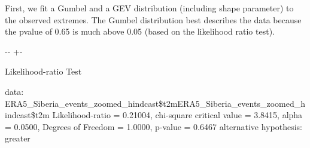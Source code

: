 \documentclass[letterpaper,10pt,english]{sphinxmanual}
\newlength\nbsphinxcodecellspacing
\begin{document}
First, we fit a Gumbel and a GEV distribution (including shape parameter) to the observed extremes. The Gumbel distribution best describes the data because the p\sphinxhyphen{}value of 0.65 is much above 0.05 (based on the likelihood ratio test).

{
\begin{sphinxVerbatim}[commandchars=\\\{\}]
\llap{\color{nbsphinxin}[11]:\,\hspace{\fboxrule}\hspace{\fboxsep}}    
                      
    
                      
 
\end{sphinxVerbatim}
}

{

\kern-\sphinxverbatimsmallskipamount\kern-\baselineskip
\kern+\FrameHeightAdjust\kern-\fboxrule
\vspace{\nbsphinxcodecellspacing}

\begin{sphinxVerbatim}[commandchars=\\\{\}]

        Likelihood-ratio Test

data:  ERA5\_Siberia\_events\_zoomed\_hindcast\$t2mERA5\_Siberia\_events\_zoomed\_hindcast\$t2m
Likelihood-ratio = 0.21004, chi-square critical value = 3.8415, alpha =
0.0500, Degrees of Freedom = 1.0000, p-value = 0.6467
alternative hypothesis: greater

\end{sphinxVerbatim}
}
\end{document}
